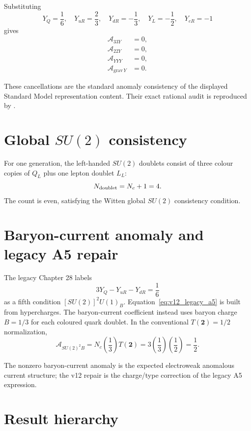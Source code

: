 Substituting
\[
Y_Q=\frac16,\quad
Y_{uR}=\frac23,\quad
Y_{dR}=-\frac13,\quad
Y_L=-\frac12,\quad
Y_{eR}=-1
\]
gives
\begin{align}
\mathcal A_{33Y}&=0,\\
\mathcal A_{22Y}&=0,\\
\mathcal A_{YYY}&=0,\\
\mathcal A_{\mathrm{grav}\,Y}&=0.
\end{align}

These cancellations are the standard anomaly consistency of the displayed Standard Model representation content. Their exact rational audit is reproduced by
.

\section[Global SU(2) consistency]{Global $SU(2)$ consistency}

For one generation, the left-handed $SU(2)$ doublets consist of three colour copies of $Q_L$ plus one lepton doublet $L_L$:
\[
N_{\rm doublet}=N_c+1=4.
\]
The count is even, satisfying the Witten global $SU(2)$ consistency condition.

\section{Baryon-current anomaly and legacy A5 repair}

The legacy Chapter 28 labels
\begin{equation}
3Y_Q-Y_{uR}-Y_{dR}=\frac16
\label{eq:v12_legacy_a5}
\end{equation}
as a fifth condition $[SU(2)]^2U(1)_B$. Equation~\eqref{eq:v12_legacy_a5} is built from hypercharges. The baryon-current coefficient instead uses baryon charge $B=1/3$ for each coloured quark doublet. In the conventional $T(\mathbf2)=1/2$ normalization,
\begin{equation}
\boxed{
\mathcal A_{SU(2)^2B}
=N_c\left(\frac13\right)T(\mathbf2)
=3\left(\frac13\right)\left(\frac12\right)
=\frac12.
}
\end{equation}

The nonzero baryon-current anomaly is the expected electroweak anomalous current structure; the v12 repair is the charge/type correction of the legacy A5 expression.

\section{Result hierarchy}

